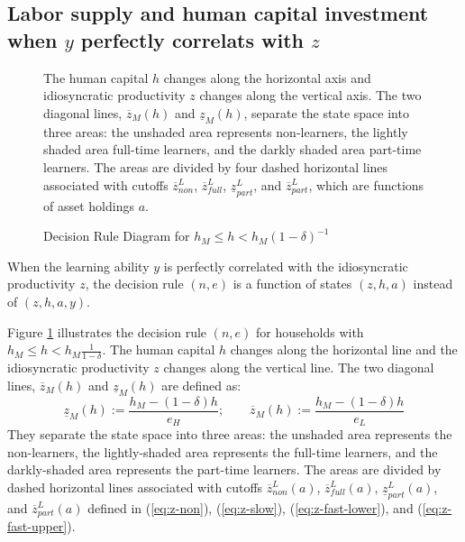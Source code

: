 \documentclass[12pt,english]{article}
\numberwithin{equation}{section}
\begin{document}
{\subsection{Labor supply and human capital investment when $y$ perfectly correlats with $z$}\label{appendix:decision_rule_diagram}

\begin{figure}[t]
    \centering
    {}
    \caption{Decision Rule Diagram for $h_M \leq h < h_M(1-\delta)^{-1}$}
    \begin{flushleft}
    \footnotesize
    The human capital $h$ changes along the horizontal axis and idiosyncratic productivity $z$ changes along the vertical axis. The two diagonal lines, $\overline{z}_M(h)$ and $\underline{z}_M(h)$, separate the state space into three areas: the unshaded area represents non-learners, the lightly shaded area full-time learners, and the darkly shaded area part-time learners. The areas are divided by four dashed horizontal lines associated with cutoffs $\overline{z}^L_{non}$, $\overline{z}^L_{full}$, $\underline{z}^L_{part}$, and $\overline{z}^L_{part}$, which are functions of asset holdings $a$.
    \end{flushleft}
    \label{fig:rule-diagram_yequalz}
\end{figure}

When the learning ability $y$ is perfectly correlated with the idiosyncratic productivity $z$, the decision rule $(n,e)$ is a function of states $(z,h,a)$ instead of $(z,h,a,y)$.


Figure \ref{fig:rule-diagram_yequalz} illustrates the decision rule $(n,e)$ for households with $h_M \leq h<h_M\frac{1}{1-\delta}$. The human capital $h$ changes along the horizontal line and the idiosyncratic productivity $z$ changes along the vertical line. The two diagonal lines, $\overline{z}_M(h)$ and $\underline{z}_M(h)$ are defined as:
\begin{equation}\label{eq:zm}
    \underline{z}_M(h):=\frac{h_M-(1-\delta)h}{e_H}; \qquad \overline{z}_M(h):=\frac{h_M-(1-\delta)h}{e_L} 
\end{equation}
They separate the state space into three areas: the unshaded area represents the non-learners, the lightly-shaded area represents the full-time learners, and the darkly-shaded area represents the part-time learners. The areas are divided by dashed horizontal lines associated with cutoffs $\overline{z}^L_{non}(a)$, $\overline{z}^L_{full}(a)$, $\underline{z}^L_{part}(a)$, and $\overline{z}^L_{part}(a)$ defined in (\ref{eq:z-non}), (\ref{eq:z-slow}), (\ref{eq:z-fast-lower}), and (\ref{eq:z-fast-upper}).


}
\end{document}
